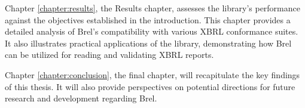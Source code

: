 
Chapter \ref{chapter:results}, the Results chapter, assesses the library's performance against the objectives established in the introduction.
This chapter provides a detailed analysis of Brel's compatibility with various XBRL conformance suites.
It also illustrates practical applications of the library, demonstrating how Brel can be utilized for reading and validating XBRL reports.

Chapter \ref{chapter:conclusion}, the final chapter, will recapitulate the key findings of this thesis.
It will also provide perspectives on potential directions for future research and development regarding Brel.
